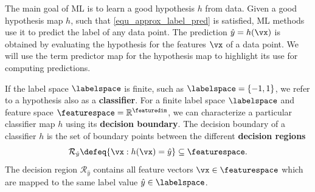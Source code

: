 \documentclass[12pt]{report}
\begin{document}
%

The main goal of ML is to learn a good hypothesis $h$ from data. 
Given a good hypothesis map $h$, such that \eqref{equ_approx_label_pred} 
is satisfied, ML methods use it to predict the label of any data point. 
The prediction $\hat{y}=h(\vx)$ is obtained by evaluating the hypothesis 
for the features $\vx$ of a data point. We will use the term predictor map 
for the hypothesis map to highlight its use for computing predictions. 

If the label space $\labelspace$ is finite, such as $\labelspace=\{-1,1\}$, 
we refer to a hypothesis also as a {\bf classifier}. For a finite label space 
$\labelspace$ and feature space $\featurespace=\mathbb{R}^{\featuredim}$, 
we can characterize a particular classifier map $h$ using its {\bf decision boundary}. 
The decision boundary of a classifier $h$ is the set of boundary points 
between the different {\bf decision regions}
\begin{equation} 
\label{equ_decision_region}
\mathcal{R}_{\hat{y}} \defeq \{ \vx: h(\vx) = \hat{y}\} \subseteq \featurespace. 
\end{equation}%
The decision region $\mathcal{R}_{\hat{y}}$ contains all feature vectors 
$\vx \in \featurespace$ which are mapped to the same label 
value $\hat{y} \in \labelspace$. 

\end{document}
